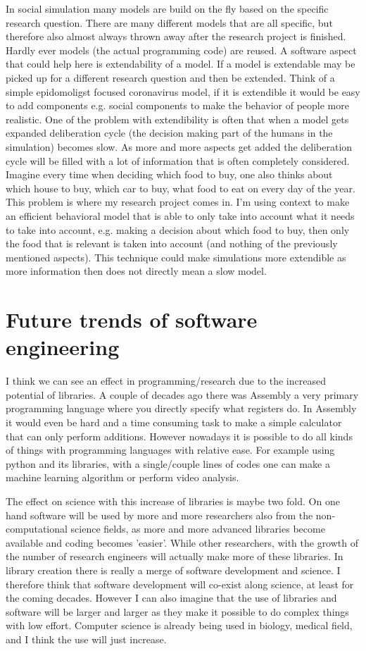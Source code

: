 \documentclass[11pt]{article}
\begin{document}
In social simulation many models are build on the fly based on the specific research question. There are many different models that are all specific, but therefore also almost always thrown away after the research project is finished. Hardly ever models (the actual programming code) are reused. A software aspect that could help here is extendability of a model. If a model is extendable may be picked up for a different research question and then be extended. Think of a simple epidomoligst focused coronavirus model, if it is extendible it would be easy to add components e.g. social components to make the behavior of people more realistic. One of the problem with extendibility is often that when a model gets expanded deliberation cycle (the decision making part of the humans in the simulation) becomes slow. As more and more aspects get added the deliberation cycle will be filled with a lot of information that is often completely considered. Imagine every time when deciding which food to buy, one also thinks about which house to buy, which car to buy, what food to eat on every day of the year. This problem is where my research project comes in. I'm using context to make an efficient behavioral model that is able to only take into account what it needs to take into account, e.g. making a decision about which food to buy, then only the food that is relevant is taken into account (and nothing of the previously mentioned aspects). This technique could make simulations more extendible as more information then does not directly mean a slow model.

\section{Future trends of software engineering}
I think we can see an effect in programming/research due to the increased potential of libraries. A couple of decades ago there was Assembly a very primary programming language where you directly specify what registers do. In Assembly it would even be hard and a time consuming task to make a simple calculator that can only perform additions. However nowadays it is possible to do all kinds of things with programming languages with relative ease. For example using python and its libraries, with a single/couple lines of codes one can make a machine learning algorithm or perform video analysis.

The effect on science with this increase of libraries is maybe two fold. On one hand software will be used by more and more researchers also from the non-computational science fields, as more and more advanced libraries become available and coding becomes 'easier'. While other researchers, with the growth of the number of research engineers will actually make more of these libraries. In library creation there is really a merge of software development and science. I therefore think that software development will co-exist along science, at least for the coming decades. However I can also imagine that the use of libraries and software will be larger and larger as they make it possible to do complex things with low effort. Computer science is already being used in biology, medical field, and I think the use will just increase.
\end{document}
